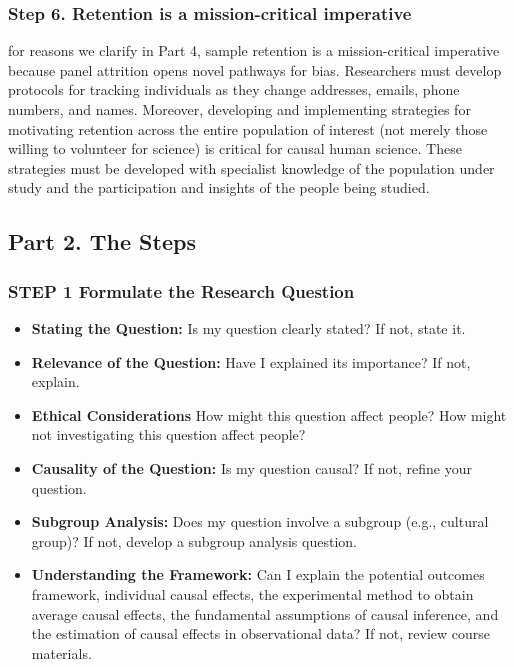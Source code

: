 \documentclass[
  singlecolumn]{article}
\providecommand{\tightlist}{%
  \setlength{\itemsep}{0pt}\setlength{\parskip}{0pt}}\usepackage{longtable,booktabs,array}
\begin{document}
\subsubsection{Step 6. Retention is a mission-critical
imperative}\label{step-6.-retention-is-a-mission-critical-imperative}

for reasons we clarify in Part 4, sample retention is a mission-critical
imperative because panel attrition opens novel pathways for bias.
Researchers must develop protocols for tracking individuals as they
change addresses, emails, phone numbers, and names. Moreover, developing
and implementing strategies for motivating retention across the entire
population of interest (not merely those willing to volunteer for
science) is critical for causal human science. These strategies must be
developed with specialist knowledge of the population under study and
the participation and insights of the people being studied.

\subsection{Part 2. The Steps}\label{part-2.-the-steps}

\subsubsection{STEP 1 Formulate the Research
Question}\label{step-1-formulate-the-research-question}

\begin{itemize}
\tightlist
\item
  \textbf{Stating the Question:} Is my question clearly stated? If not,
  state it.
\item
  \textbf{Relevance of the Question:} Have I explained its importance?
  If not, explain.
\item
  \textbf{Ethical Considerations} How might this question affect people?
  How might not investigating this question affect people?
\item
  \textbf{Causality of the Question:} Is my question causal? If not,
  refine your question.
\item
  \textbf{Subgroup Analysis:} Does my question involve a subgroup (e.g.,
  cultural group)? If not, develop a subgroup analysis question.
\item
  \textbf{Understanding the Framework:} Can I explain the potential
  outcomes framework, individual causal effects, the experimental method
  to obtain average causal effects, the fundamental assumptions of
  causal inference, and the estimation of causal effects in
  observational data? If not, review course materials.
\end{itemize}
\end{document}
